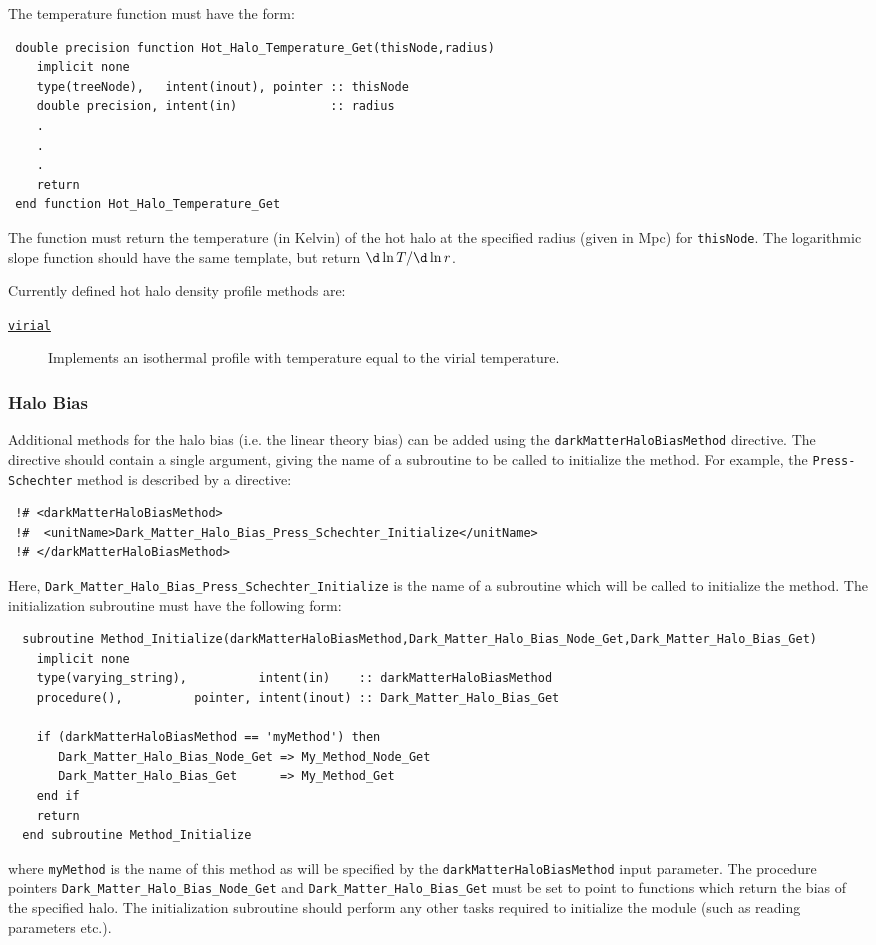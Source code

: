 The temperature function must have the form:
\begin{verbatim}
 double precision function Hot_Halo_Temperature_Get(thisNode,radius)
    implicit none
    type(treeNode),   intent(inout), pointer :: thisNode
    double precision, intent(in)             :: radius
    .
    .
    .
    return
 end function Hot_Halo_Temperature_Get
\end{verbatim}
The function must return the temperature (in Kelvin) of the hot halo at the specified radius (given in Mpc) for {\tt thisNode}. The logarithmic slope function should have the same template, but return $\d\ln T / \d \ln r$.

Currently defined hot halo density profile methods are:
\begin{description}
 \item [\hyperlink{hot_halo.temperature_profile.virial.F90:hot_halo_temperature_profile_virial:hot_halo_temperature_virial_get}{{\tt virial}}] Implements an isothermal profile with temperature equal to the virial temperature.
\end{description}

\subsubsection{Halo Bias}

Additional methods for the halo bias (i.e. the linear theory bias) can be added using the {\tt darkMatterHaloBiasMethod} directive. The directive should contain a single argument, giving the name of a subroutine to be called to initialize the method. For example, the {\tt Press-Schechter} method is described by a directive:
\begin{verbatim}
 !# <darkMatterHaloBiasMethod>
 !#  <unitName>Dark_Matter_Halo_Bias_Press_Schechter_Initialize</unitName>
 !# </darkMatterHaloBiasMethod>
\end{verbatim}
Here, {\tt Dark\_Matter\_Halo\_Bias\_Press\_Schechter\_Initialize} is the name of a subroutine which will be called to initialize the method. The initialization subroutine must have the following form:
\begin{verbatim}
  subroutine Method_Initialize(darkMatterHaloBiasMethod,Dark_Matter_Halo_Bias_Node_Get,Dark_Matter_Halo_Bias_Get)
    implicit none
    type(varying_string),          intent(in)    :: darkMatterHaloBiasMethod
    procedure(),          pointer, intent(inout) :: Dark_Matter_Halo_Bias_Get
    
    if (darkMatterHaloBiasMethod == 'myMethod') then
       Dark_Matter_Halo_Bias_Node_Get => My_Method_Node_Get
       Dark_Matter_Halo_Bias_Get      => My_Method_Get
    end if
    return
  end subroutine Method_Initialize
\end{verbatim}
where {\tt myMethod} is the name of this method as will be specified by the {\tt darkMatterHaloBiasMethod} input parameter. The procedure pointers {\tt Dark\_Matter\_Halo\_Bias\_Node\_Get} and {\tt Dark\_Matter\_Halo\_Bias\_Get} must be set to point to functions which return the bias of the specified halo. The initialization subroutine should perform any other tasks required to initialize the module (such as reading parameters etc.).

